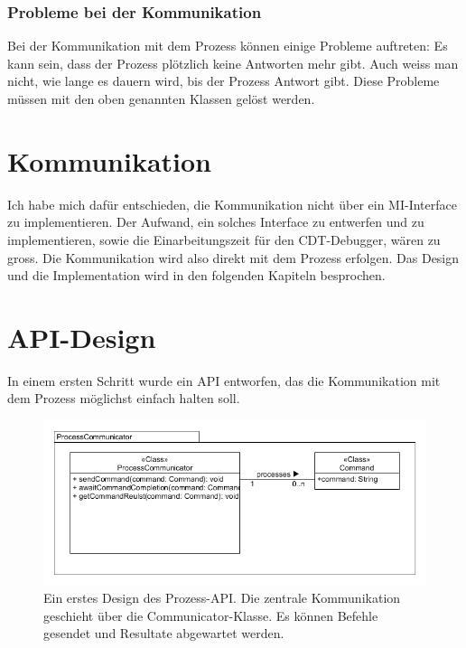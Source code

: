 \subsubsection{Probleme bei der Kommunikation}

Bei der Kommunikation mit dem Prozess können einige Probleme auftreten: Es kann sein, dass der Prozess plötzlich keine Antworten mehr gibt. Auch weiss man nicht, wie lange es dauern wird, bis der Prozess Antwort gibt. Diese Probleme müssen mit den oben genannten Klassen gelöst werden.

\section{Kommunikation}

Ich habe mich dafür entschieden, die Kommunikation nicht über ein MI-Interface zu implementieren. Der Aufwand, ein solches Interface zu entwerfen und zu implementieren, sowie die Einarbeitungszeit für den CDT-Debugger, wären zu gross. Die Kommunikation wird also direkt mit dem Prozess erfolgen. Das Design und die Implementation wird in den folgenden Kapiteln besprochen.

\section{API-Design}

In einem ersten Schritt wurde ein API entworfen, das die Kommunikation mit dem Prozess möglichst einfach halten soll.

\begin{figure}[H]
	\centering
		\includegraphics[scale=0.6]{forthcommunication/api.png}
		\caption{Ein erstes Design des Prozess-API. Die zentrale Kommunikation geschieht über die Communicator-Klasse. Es können Befehle gesendet und Resultate abgewartet werden.}
		\label{fig:api}
\end{figure}

